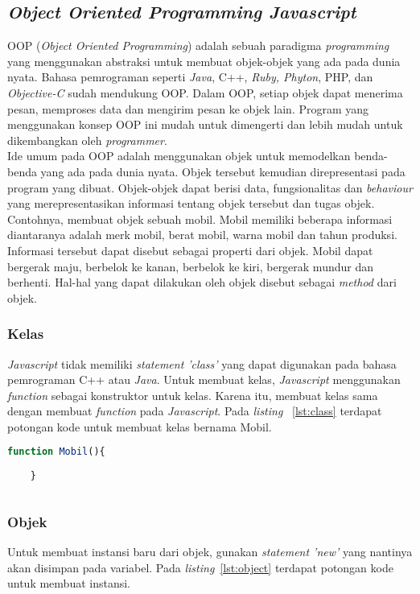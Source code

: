 \subsection{\textit{Object Oriented Programming Javascript}}
OOP (\textit{Object Oriented Programming}) adalah sebuah paradigma \textit{programming} yang menggunakan abstraksi untuk membuat objek-objek yang ada pada dunia nyata. Bahasa pemrograman seperti \textit{Java}, C++, \textit{Ruby, Phyton}, PHP, dan \textit{Objective-C} sudah mendukung OOP. Dalam OOP, setiap objek dapat menerima pesan, memproses data dan mengirim pesan ke objek lain. Program yang menggunakan konsep OOP ini mudah untuk dimengerti dan lebih mudah untuk dikembangkan oleh \textit{programmer}. \\

Ide umum pada OOP adalah menggunakan objek untuk memodelkan benda-benda yang ada pada dunia nyata. Objek tersebut kemudian direpresentasi pada program yang dibuat. Objek-objek dapat berisi data, fungsionalitas dan \textit{behaviour} yang merepresentasikan informasi tentang objek tersebut dan tugas objek. Contohnya, membuat objek sebuah mobil. Mobil memiliki beberapa informasi diantaranya adalah merk mobil, berat mobil, warna mobil dan tahun produksi. Informasi tersebut dapat disebut sebagai properti dari objek. Mobil dapat bergerak maju, berbelok ke kanan, berbelok ke kiri, bergerak mundur dan berhenti. Hal-hal yang dapat dilakukan oleh objek disebut sebagai \textit{method} dari objek. 

\subsubsection{Kelas}
\textit{Javascript} tidak memiliki \textit{statement 'class'} yang dapat digunakan pada bahasa pemrograman C++ atau \textit{Java}. Untuk membuat kelas, \textit{Javascript} menggunakan \textit{function} sebagai konstruktor untuk kelas. Karena itu, membuat kelas sama dengan membuat \textit{function} pada \textit{Javascript}. Pada \textit{listing} ~\ref{lst:class} terdapat potongan kode untuk membuat kelas bernama Mobil.

\begin{lstlisting}[language=Javascript, caption=Membuat kelas Mobil, label={lst:class}]
	function Mobil(){
	
	}
	
\end{lstlisting}

\subsubsection{Objek}
Untuk membuat instansi baru dari objek, gunakan \textit{statement 'new'} yang nantinya akan disimpan pada variabel. Pada \textit{listing}~\ref{lst:object} terdapat potongan kode untuk membuat instansi.

